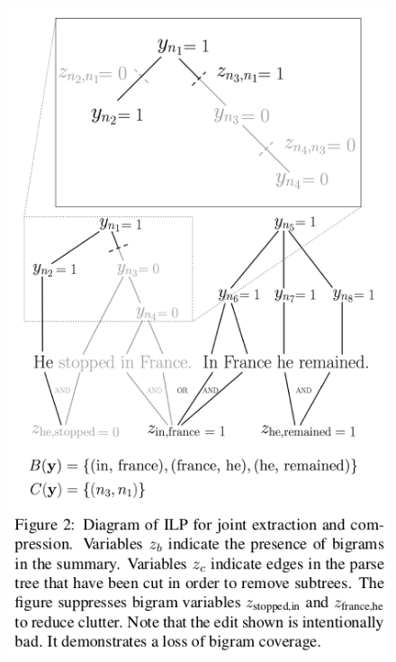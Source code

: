 \documentclass[xcolor={table}]{beamer}
\begin{document}
\begin{frame}[t]{\cite{berg2011jointly}}
      \begin{figure}[h]
          \centering
      \includegraphics[scale=.29]{images/figure2-bergkirkpatrick11.png} \\
  \end{figure}
\end{frame}
\end{document}
